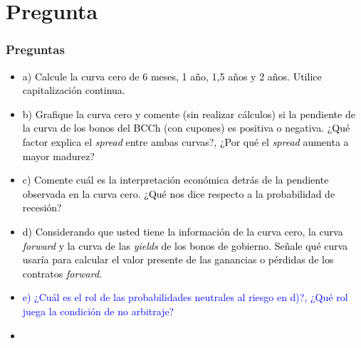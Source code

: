 \documentclass{beamer}
\begin{document}
\section{Pregunta }

\begin{frame}
  \frametitle{Preguntas}
  \begin{itemize}
    \scriptsize
    \item {\textcolor{black}{a) Calcule la curva cero de 6 meses, 1 año, 1,5 años y 2 años. Utilice capitalización continua.}}
    \vspace{3pt}
    \item {\textcolor{black}{b) Grafique la curva cero y comente (sin realizar cálculos) si la pendiente de la curva de los bonos del BCCh (con cupones) es positiva o negativa. ¿Qué factor explica el \textit{spread} entre ambas curvas?, ¿Por qué el \textit{spread} aumenta a mayor madurez?}}
    \vspace{3pt}
    \item {\textcolor{black}{c) Comente cuál es la interpretación económica detrás de la pendiente observada en la curva cero. ¿Qué nos dice respecto a la probabilidad de recesión?}}
    \vspace{3pt}
    \item {\textcolor{black}{d) Considerando que usted tiene la información de la curva cero, la curva \textit{forward} y la curva de las \textit{yields} de los bonos de gobierno. Señale qué curva usaría para calcular el valor presente de las ganancias o pérdidas de los contratos \textit{forward}.}}
    \vspace{3pt}
    \item {\Large\textcolor{blue}{e) ¿Cuál es el rol de las probabilidades neutrales al riesgo en d)?, ¿Qué rol juega la condición de no arbitraje?}}
    \vspace{3pt}
    \item {\textcolor{white}{f) Calcule el punto a) utilizando matrices en Excel/R/Python.}}
    \vspace{3pt}
  \end{itemize}
\end{frame}
\end{document}
